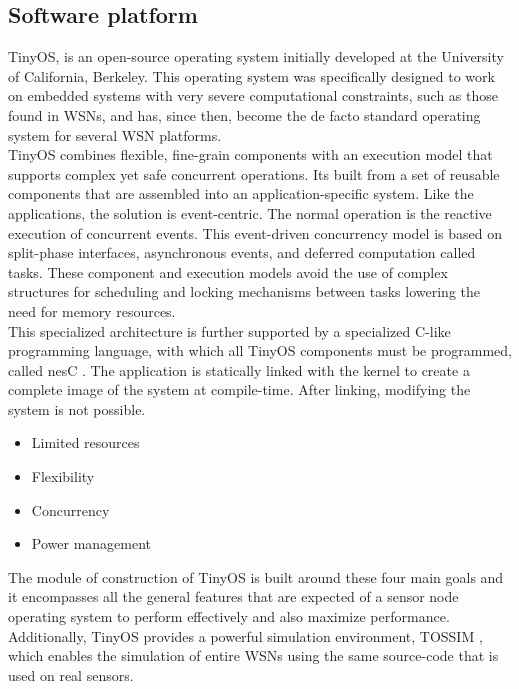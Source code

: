 \subsection{Software platform}
TinyOS, is an open-source operating system initially developed at the University of California, Berkeley. This operating system was specifically designed to work on embedded systems with very severe computational constraints, such as those found in WSNs, and has, since then, become the de facto standard operating system for several WSN platforms.\\
TinyOS combines flexible, fine-grain components with an execution model that supports complex yet safe concurrent
operations. Its built from a set of reusable components that are assembled into an application-specific system. Like the
applications, the solution is event-centric. The normal operation is the reactive execution of concurrent events. This event-driven concurrency model is based on split-phase interfaces, asynchronous events, and deferred computation called tasks.
These component and execution models avoid the use of complex structures for scheduling and locking mechanisms between
tasks lowering the need for memory resources.\\
This specialized architecture is further supported by a specialized C-like programming language, with which all TinyOS components must be programmed, called nesC \cite{gay03}. The application is statically linked with the kernel to create a
complete image of the system at compile-time. After linking, modifying the system is not possible.

\begin{itemize}
\item Limited resources
\item Flexibility
\item Concurrency
\item Power management
\end{itemize}

The module of construction of TinyOS is built around these four main goals and it encompasses all the general features that
are expected of a sensor node operating system to perform effectively and also maximize performance.
Additionally, TinyOS provides a powerful simulation environment, TOSSIM \cite{levis03} \cite{lee03}, which enables the simulation of entire WSNs using the same source-code that is used on real sensors.

